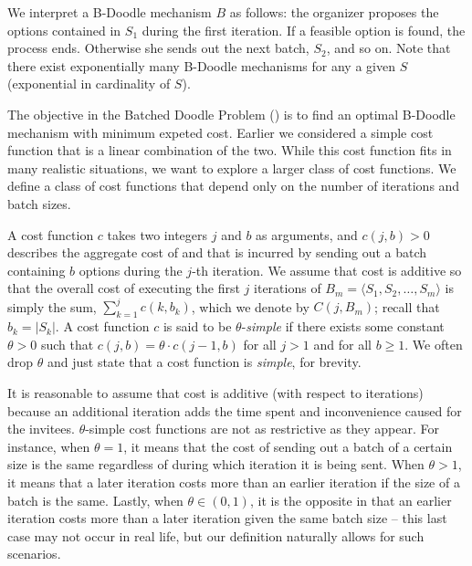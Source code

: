 We interpret a B-Doodle mechanism $B$ as follows: the organizer proposes the options contained in $S_1$ during the first iteration. If a feasible option is found, the process ends. Otherwise she sends out the next batch, $S_2$, and so on.
Note that there exist exponentially many B-Doodle mechanisms for any a given $S$ (exponential in cardinality of $S$).

The objective in the Batched Doodle Problem (\BDP) is to find an optimal B-Doodle mechanism with minimum expeted cost.
Earlier we considered a simple cost function that is a linear combination of the two.
While this cost function fits in many realistic situations, we want to explore a larger class of cost functions.
We define a class of cost functions that depend only on the number of iterations and batch sizes.
\begin{definition} \label{bdoodle:def:CostFunction}
	A cost function $c$ takes two integers $j$ and $b$ as arguments, and $c(j, b) > 0$ describes the aggregate cost of \Times and \Inconveniences that is incurred by sending out a batch containing $b$ options during the $j$-th iteration. 
	We assume that cost is additive so that the overall cost of executing the first $j$ iterations of ${B}_m = \langle S_1, S_2, \dots, S_m \rangle$ is simply the sum, $\sum_{k=1}^{j} c(k, b_k)$, which we denote by $C(j, {B}_m)$; recall that $b_k = |S_k|$.
A cost function $c$ is said to be $\theta$-\emph{simple} if there exists some constant $\theta>0$ such that $c(j, b) = \theta \cdot c(j-1, b)$ for all $j > 1$ and for all $b \geq 1$.
We often drop $\theta$ and just state that a cost function is \emph{simple}, for brevity.
\end{definition}
It is reasonable to assume that cost is additive (with respect to iterations) because an additional iteration adds the time spent and inconvenience caused for the invitees.
$\theta$-simple cost functions are not as restrictive as they appear.
For instance, when $\theta = 1$, it means that the cost of sending out a batch of a certain size is the same regardless of during which iteration it is being sent. When $\theta > 1$, it means that a later iteration costs more than an earlier iteration if the size of a batch is the same. Lastly, when $\theta \in (0, 1)$, it is the opposite in that an earlier iteration costs more than a later iteration given the same batch size -- this last case may not occur in real life, but our definition naturally allows for such scenarios. 

